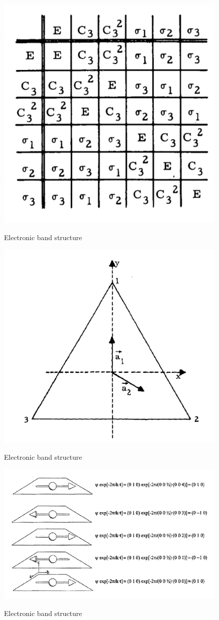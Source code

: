 \documentclass[11pt,edeposit,draftthesis]{uiucthesis2020}
\begin{document}
\begin{mainmatter}
\begin{figure}
\centering\includegraphics[width=0.5\columnwidth]{figures/ch3/group_multiplication_table_C3v.png} \\
\caption{\label{fig:gmt_C3v}
Electronic band structure
}
\end{figure}

\begin{figure}
\centering\includegraphics[width=0.5\columnwidth]{figures/ch3/C3v_a1_a2.png} \\
\caption{\label{fig:C3v_a1_a2}
Electronic band structure
}
\end{figure}

\begin{figure}
\centering\includegraphics[width=\columnwidth]{figures/ch3/propagation_vector.png} \\
\caption{\label{fig:propagation_vector}
Electronic band structure
}
\end{figure}


\end{mainmatter}
\end{document}
